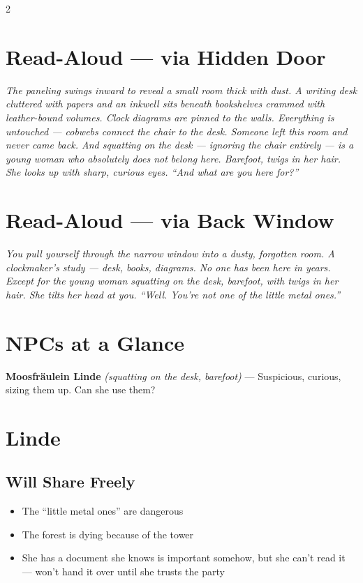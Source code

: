 \documentclass[10pt,letterpaper]{article}
\newcommand{\npc}[3]{\textbf{#1} \textit{(#2)} --- #3}
\begin{document}
\begin{multicols}{2}

\section*{Read-Aloud --- via Hidden Door}
\begin{readaloud}
\itshape
The paneling swings inward to reveal a small room thick with dust. A writing desk cluttered with papers and an inkwell sits beneath bookshelves crammed with leather-bound volumes. Clock diagrams are pinned to the walls. Everything is untouched --- cobwebs connect the chair to the desk. Someone left this room and never came back. And squatting on the desk --- ignoring the chair entirely --- is a young woman who absolutely does not belong here. Barefoot, twigs in her hair. She looks up with sharp, curious eyes. ``And what are you here for?''
\end{readaloud}

\section*{Read-Aloud --- via Back Window}
\begin{readaloud}
\itshape
You pull yourself through the narrow window into a dusty, forgotten room. A clockmaker's study --- desk, books, diagrams. No one has been here in years. Except for the young woman squatting on the desk, barefoot, with twigs in her hair. She tilts her head at you. ``Well. You're not one of the little metal ones.''
\end{readaloud}

\section*{NPCs at a Glance}

\npc{Moosfräulein Linde}{squatting on the desk, barefoot}{Suspicious, curious, sizing them up. Can she use them?}

\section*{Linde}
\subsection*{Will Share Freely}
\begin{itemize}
\item The ``little metal ones'' are dangerous
\item The forest is dying because of the tower
\item She has a document she knows is important somehow, but she can't read it --- won't hand it over until she trusts the party
\end{itemize}

\end{multicols}
\end{document}
